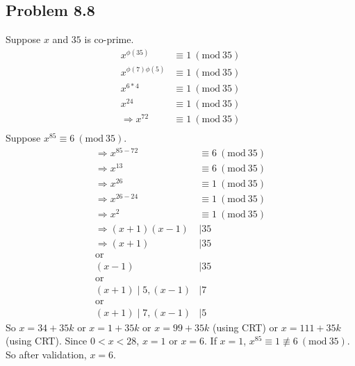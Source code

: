 \documentclass[acmlarge,screen]{acmart}
\begin{document}
\begin{CJK*}{UTF8}{gbsn}
\section{Problem 8.8}
Suppose $x$ and $35$ is co-prime.
\begin{align*}
	x^{\phi (35)}&\equiv1\ (\text{mod}\ 35)\\
	x^{\phi (7) \phi (5)}&\equiv1\ (\text{mod}\ 35)\\
	x^{6*4}&\equiv1\ (\text{mod}\ 35)\\
	x^{24}&\equiv1\ (\text{mod}\ 35)\\
	\Rightarrow x^{72}&\equiv1\ (\text{mod}\ 35)\\
\end{align*}
Suppose $x^{85}\equiv6\ (\text{mod}\ 35)$.
\begin{align*}
	\Rightarrow x^{85-72}&\equiv6\ (\text{mod}\ 35)\\
	\Rightarrow x^{13}&\equiv6\ (\text{mod}\ 35)\\
	\Rightarrow x^{26}&\equiv1\ (\text{mod}\ 35)\\
	\Rightarrow x^{26-24}&\equiv1\ (\text{mod}\ 35)\\
	\Rightarrow x^{2}&\equiv1\ (\text{mod}\ 35)\\
	\Rightarrow (x+1)(x-1) &\mid 35\\
	\Rightarrow (x+1)&\mid35\\
	\text{or}\\
	(x-1)&\mid35\\
	\text{or}\\
	(x+1)\mid5,(x-1)&\mid7\\
	\text{or}\\
	(x+1)\mid7,(x-1)&\mid5
\end{align*}
So $x=34+35k$ or $x=1+35k$ or $x=99+35k$ (using CRT) or $x=111+35k$ (using CRT). Since $0<x<28$, $x=1$ or $x=6$. If $x=1$, $x^{85}\equiv1\nequiv6\ (\text{mod}\ 35)$. So after validation, $x=6$.

\end{CJK*}
\end{document}
